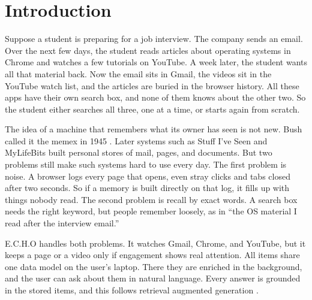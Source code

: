 \documentclass[conference]{IEEEtran}
\begin{document}
\section{Introduction}
Suppose a student is preparing for a job interview. The company sends an email. Over the next few days, the student reads articles about operating systems in Chrome and watches a few tutorials on YouTube. A week later, the student wants all that material back. Now the email sits in Gmail, the videos sit in the YouTube watch list, and the articles are buried in the browser history. All these apps have their own search box, and none of them knows about the other two. So the student either searches all three, one at a time, or starts again from scratch.

The idea of a machine that remembers what its owner has seen is not new. Bush called it the memex in 1945 \cite{b1}. Later systems such as Stuff I've Seen \cite{b2} and MyLifeBits \cite{b3} built personal stores of mail, pages, and documents. But two problems still make such systems hard to use every day. The first problem is noise. A browser logs every page that opens, even stray clicks and tabs closed after two seconds. So if a memory is built directly on that log, it fills up with things nobody read. The second problem is recall by exact words. A search box needs the right keyword, but people remember loosely, as in ``the OS material I read after the interview email.''

E.C.H.O handles both problems. It watches Gmail, Chrome, and YouTube, but it keeps a page or a video only if engagement shows real attention. All items share one data model on the user's laptop. There they are enriched in the background, and the user can ask about them in natural language. Every answer is grounded in the stored items, and this follows retrieval augmented generation \cite{b4}.
\end{document}
